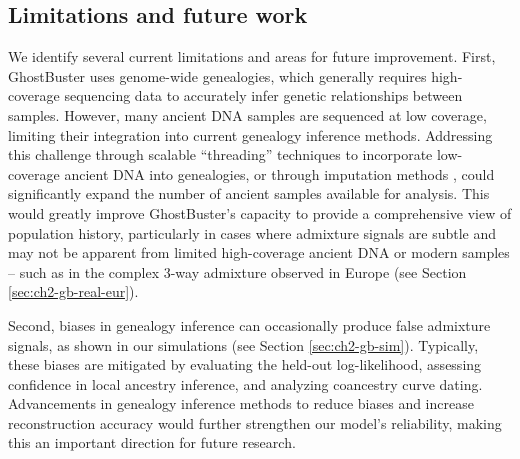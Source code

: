\subsection{Limitations and future work}

We identify several current limitations and areas for future improvement. First, GhostBuster uses genome-wide genealogies, which generally requires high-coverage sequencing data to accurately infer genetic relationships between samples. However, many ancient DNA samples are sequenced at low coverage, limiting their integration into current genealogy inference methods. Addressing this challenge through scalable ``threading'' techniques to incorporate low-coverage ancient DNA into genealogies, or through imputation methods \cite{rubinacci2021efficient, sousa2023imputation}, could significantly expand the number of ancient samples available for analysis. This would greatly improve GhostBuster’s capacity to provide a comprehensive view of population history, particularly in cases where admixture signals are subtle and may not be apparent from limited high-coverage ancient DNA or modern samples -- such as in the complex 3-way admixture observed in Europe (see Section \ref{sec:ch2-gb-real-eur}). 


Second, biases in genealogy inference can occasionally produce false admixture signals, as shown in our simulations (see Section \ref{sec:ch2-gb-sim}). Typically, these biases are mitigated by evaluating the held-out log-likelihood, assessing confidence in local ancestry inference, and analyzing coancestry curve dating. Advancements in genealogy inference methods to reduce biases and increase reconstruction accuracy would further strengthen our model’s reliability, making this an important direction for future research.


